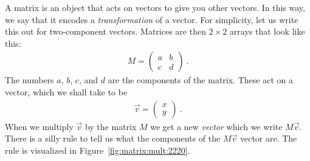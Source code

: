 A matrix is an object that acts on vectors to give you other vectors. In this way, we say that it encodes a \emph{transformation} of a vector. For simplicity, let us write this out for two-component vectors. Matrices are then $2\times2$ arrays that look like this:
\begin{align}
    M = \begin{pmatrix}
        a & b\\
        c & d
    \end{pmatrix} \ .
\end{align}
The numbers $a$, $b$, $c$, and $d$ are the components of the matrix. These act on a vector, which we shall take to be
\begin{align}
    \vec{v} = \begin{pmatrix}
        x \\ y
    \end{pmatrix} \ .
\end{align}
% 
When we multiply $\vec{v}$ by the matrix $M$ we get a new \emph{vector} which we write $M\vec{v}$. 
There is a silly rule to tell us what the components of the $M\vec{v}$ vector are.
The rule is visualized in Figure~\ref{fig:matrix:mult:2220}.
